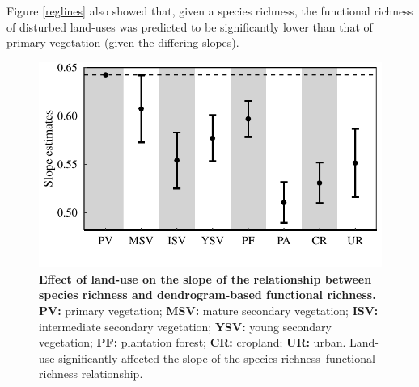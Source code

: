 Figure \ref{reglines} also showed that, given a species richness, the functional richness of disturbed land-uses was predicted to be significantly lower than that of primary vegetation (given the differing slopes). 

\vspace{1cm}
\begin{figure}[h!]
\centering
\includegraphics[scale=0.70]{figures/chapter3/DFR/Mean_effect}
\caption[Effect of land-use on the slope of the relationship between species richness and dendrogram-based functional richness]{\textbf{Effect of land-use on the slope of the relationship between species richness and dendrogram-based functional richness.} \textbf{PV:} primary vegetation; \textbf{MSV:} mature secondary vegetation; \textbf{ISV:} intermediate secondary vegetation; \textbf{YSV:} young secondary vegetation; \textbf{PF:} plantation forest; \textbf{CR:} cropland; \textbf{UR:} urban. Land-use significantly affected the slope of the species richness--functional richness relationship.}
\label{slopesDFR}
\end{figure}

